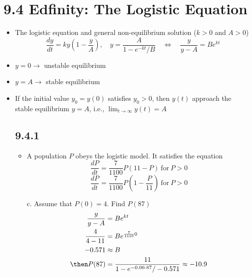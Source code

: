 
\section{9.4 Edfinity: The Logistic Equation}
\begin{itemize}
  \item The logistic equation and general non-equilibrium solution (\( k > 0 \)
    and  \( A > 0 \))
  \[%
    \frac{dy}{dt} = ky\left( 1 - \frac{y}{A} \right), \quad
    y = \frac{A}{1-e^{-kt}/B} \quad \Leftrightarrow \quad
   \frac{y}{y-A} = Be^{kt}
  \]%
  \item \( y = 0 \to \) unstable equilibrium
  \item \( y = A \to \) stable equilibrium
  \item If the initial value \( y_0 = y(0) \) satisfies \( y_0 > 0 \), then \(
    y(t) \) approach the stable equilibrium  \( y = A \), i.e.,  \( \lim_{t \to
    \infty} y(t) = A \)

  \subsection{9.4.1}
  \begin{itemize}
    \item A population \( P \) obeys the logistic model. It satisfies the equation
      \[ \frac{dP}{dt} = \frac{7}{1100}P(11-P) ~\text{for}~ P > 0 \]
      \[ \frac{dP}{dt} = \frac{7}{1100}P(1-\frac{P}{11}) ~\text{for}~ P > 0 \]
    \item[c.] Assume that \( P(0) = 4 \). Find \( P(87) \)
      \begin{align*}
        \frac{y}{y-A} &= Be^{kt} \\
        \frac{4}{4-11} &= Be^{\frac{7}{1110}0}  \\
        -0.571 &\approx B \\
        \then P(87) &= \frac{11}{1-e^{-0.06\cdot87} / -0.571} \approx -10.9
      \end{align*}
  \end{itemize}


\end{itemize}
